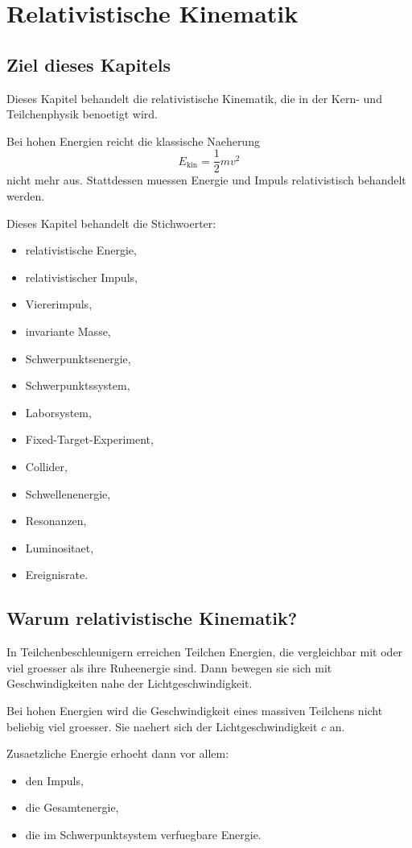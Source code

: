 \chapter{Relativistische Kinematik}

\section{Ziel dieses Kapitels}

Dieses Kapitel behandelt die relativistische Kinematik, die in der Kern- und
Teilchenphysik benoetigt wird.

Bei hohen Energien reicht die klassische Naeherung
\[
    E_{\mathrm{kin}}=\frac{1}{2}mv^2
\]
nicht mehr aus.
Stattdessen muessen Energie und Impuls relativistisch behandelt werden.

\begin{notebox}
Dieses Kapitel behandelt die Stichwoerter:
\begin{itemize}
    \item relativistische Energie,
    \item relativistischer Impuls,
    \item Viererimpuls,
    \item invariante Masse,
    \item Schwerpunktsenergie,
    \item Schwerpunktssystem,
    \item Laborsystem,
    \item Fixed-Target-Experiment,
    \item Collider,
    \item Schwellenenergie,
    \item Resonanzen,
    \item Luminositaet,
    \item Ereignisrate.
\end{itemize}
\end{notebox}

\section{Warum relativistische Kinematik?}

In Teilchenbeschleunigern erreichen Teilchen Energien, die vergleichbar mit oder
viel groesser als ihre Ruheenergie sind.
Dann bewegen sie sich mit Geschwindigkeiten nahe der Lichtgeschwindigkeit.

\begin{conceptbox}
Bei hohen Energien wird die Geschwindigkeit eines massiven Teilchens nicht beliebig
viel groesser.
Sie naehert sich der Lichtgeschwindigkeit $c$ an.

Zusaetzliche Energie erhoeht dann vor allem:
\begin{itemize}
    \item den Impuls,
    \item die Gesamtenergie,
    \item die im Schwerpunktsystem verfuegbare Energie.
\end{itemize}
\end{conceptbox}

